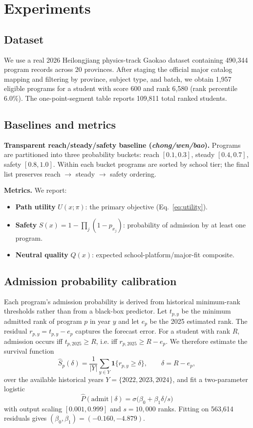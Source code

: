\documentclass[11pt,a4paper]{article}
\begin{document}
\section{Experiments}\label{sec:experiments}

\subsection{Dataset}

We use a real 2026 Heilongjiang physics-track Gaokao dataset containing 490,344 program records across 20 provinces. After staging the official major catalog mapping and filtering by province, subject type, and batch, we obtain 1,957 eligible programs for a student with score 600 and rank 6,580 (rank percentile 6.0\%). The one-point-segment table reports 109,811 total ranked students.

\subsection{Baselines and metrics}

\textbf{Transparent reach/steady/safety baseline (\emph{chong/wen/bao}).} Programs are partitioned into three probability buckets: reach $[0.1, 0.3]$, steady $[0.4, 0.7]$, safety $[0.8, 1.0]$. Within each bucket programs are sorted by school tier; the final list preserves reach $\to$ steady $\to$ safety ordering.

\textbf{Metrics.} We report:
\begin{itemize}
  \item \textbf{Path utility} $U(x; \pi)$: the primary objective (Eq.~\ref{eq:utility}).
  \item \textbf{Safety} $S(x) = 1 - \prod_j(1 - p_{x_j})$: probability of admission by at least one program.
  \item \textbf{Neutral quality} $Q(x)$: expected school-platform/major-fit composite.
\end{itemize}

\subsection{Admission probability calibration}\label{sec:calibration}

Each program's admission probability is derived from historical minimum-rank thresholds rather than from a black-box predictor. Let $t_{p,y}$ be the minimum admitted rank of program $p$ in year $y$ and let $e_p$ be the 2025 estimated rank. The residual $r_{p,y}=t_{p,y}-e_p$ captures the forecast error. For a student with rank $R$, admission occurs iff $t_{p,2025}\ge R$, i.e. iff $r_{p,2025}\ge R-e_p$. We therefore estimate the survival function
\[
\hat S_p(\delta)=\frac{1}{|Y|}\sum_{y\in Y}\mathbf 1\{r_{p,y}\ge \delta\},
\qquad \delta=R-e_p,
\]
over the available historical years $Y=\{2022,2023,2024\}$, and fit a two-parameter logistic
\[
\hat P(\text{admit}\mid \delta)=\sigma\bigl(\beta_0+\beta_1\delta/s\bigr)
\]
with output scaling $[0.001,0.999]$ and $s=10{,}000$ ranks. Fitting on 563,614 residuals gives $(\beta_0,\beta_1)=(-0.160,-4.879)$.
\end{document}

